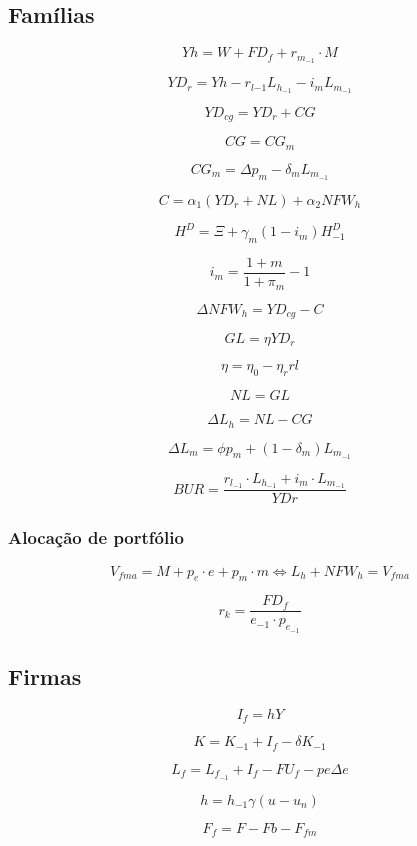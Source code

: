 \documentclass[11pt]{article}
\begin{document}
    \hypertarget{famuxedlias}{%
\subsection{Famílias}\label{famuxedlias}}

\[
Yh = W + FD_f + r_{m_{-1}}\cdot M 
\]

\[
YD_r = Yh - r_{l{-1}}L_{h_{-1}} - i_mL_{m_{-1}}
\]

\[
YD_{cg} = YD_r + CG
\]

\[
CG = CG_m
\]

\[
CG_m = \Delta p_m - \delta_m L_{m_{-1}}
\]

\[
C = \alpha_1(YD_r + NL) + \alpha_2 NFW_h
\]

\[
H^D = \Xi + \gamma_m (1- i_m)H^D_{-1}
\]

\[
i_m = \frac{1+m}{1+\pi_m} - 1
\]

\[
\Delta NFW_h = YD_{cg} - C
\]

\[
GL = \eta YD_r
\]

\[
\eta = \eta_0 -\eta_rrl
\]

\[
NL = GL
\]

\[
\Delta L_h = NL  - CG
\]

\[
\Delta L_m = \phi p_m + (1-\delta_m) L_{m_{-1}} 
\]

\[
BUR = \frac{r_{l_{-1}}\cdot L_{h_{-1}} + i_m\cdot L_{m_{-1}}}{YDr}
\]

    \hypertarget{alocauxe7uxe3o-de-portfuxf3lio}{%
\subsubsection{Alocação de
portfólio}\label{alocauxe7uxe3o-de-portfuxf3lio}}

\[
V_{fma} = M + p_e\cdot e + p_m\cdot m \Leftrightarrow L_h + NFW_h = V_{fma}
\]

\[
r_k = \frac{FD_f}{e_{-1}\cdot p_{e_{-1}}}
\]

    \hypertarget{firmas}{%
\subsection{Firmas}\label{firmas}}

\[
I_f = hY
\]

\[
K = K_{-1} + I_f - \delta K_{-1}
\]

\[
L_f = L_{f_{-1}} + I_f - FU_f - pe\Delta e
\]

\[
h = h_{-1}\gamma (u - u_n)
\]

\[
F_f = F - Fb - F_{fm}
\]
\end{document}
